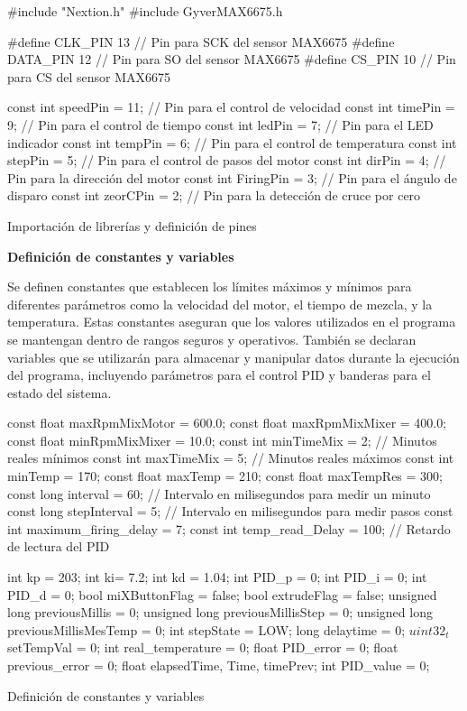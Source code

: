 \documentclass[14pt,oneside]{extarticle} %
\begin{document}
\begin{algorithm}[H]
\SetAlgoLined

\#include "Nextion.h" \;
\#include GyverMAX6675.h \;

\#define CLK\_PIN 13 // Pin para SCK del sensor MAX6675 \;
\#define DATA\_PIN 12 // Pin para SO del sensor MAX6675 \;
\#define CS\_PIN 10 // Pin para CS del sensor MAX6675 \;

const int speedPin = 11; // Pin para el control de velocidad \;
const int timePin = 9; // Pin para el control de tiempo \;
const int ledPin = 7; // Pin para el LED indicador \;
const int tempPin = 6; // Pin para el control de temperatura \;
const int stepPin = 5; // Pin para el control de pasos del motor \;
const int dirPin = 4; // Pin para la dirección del motor \;
const int FiringPin = 3; // Pin para el ángulo de disparo \;
const int zeorCPin = 2; // Pin para la detección de cruce por cero \;

\caption{Importación de librerías y definición de pines}
\label{al:ImportacionDefinicionPines}
\end{algorithm}

\textbf{Definición de constantes y variables}

Se definen constantes que establecen los límites máximos y mínimos para diferentes parámetros como la velocidad del motor, el tiempo de mezcla, y la temperatura. Estas constantes aseguran que los valores utilizados en el programa se mantengan dentro de rangos seguros y operativos. También se declaran variables que se utilizarán para almacenar y manipular datos durante la ejecución del programa, incluyendo parámetros para el control PID y banderas para el estado del sistema.

\begin{algorithm}[H]
\SetAlgoLined

const float maxRpmMixMotor = 600.0; \;
const float maxRpmMixMixer = 400.0; \;
const float minRpmMixMixer = 10.0; \;
const int minTimeMix = 2; // Minutos reales mínimos \;
const int maxTimeMix = 5; // Minutos reales máximos \;
const int minTemp = 170; \;
const float maxTemp = 210; \;
const float maxTempRes = 300; \;
const long interval = 60; // Intervalo en milisegundos para medir un minuto \;
const long stepInterval = 5; // Intervalo en milisegundos para medir pasos \;
const int maximum\_firing\_delay = 7; \;
const int temp\_read\_Delay = 100; // Retardo de lectura del PID \;

int kp = 203; int ki= 7.2; int kd = 1.04; \;
int PID\_p = 0; int PID\_i = 0; int PID\_d = 0; \;
bool miXButtonFlag = false; \;
bool extrudeFlag = false; \;
unsigned long previousMillis = 0; \;
unsigned long previousMillisStep = 0; \;
unsigned long previousMillisMesTemp = 0; \;
int stepState = LOW; \;
long delaytime = 0; \;
$uint32_t$ setTempVal = 0; \;
int real\_temperature = 0; \;
float PID\_error = 0; \;
float previous\_error = 0; \;
float elapsedTime, Time, timePrev; \;
int PID\_value = 0; \;

\caption{Definición de constantes y variables}
\label{al:DefinicionConstantesVariables}
\end{algorithm}
\end{document}
